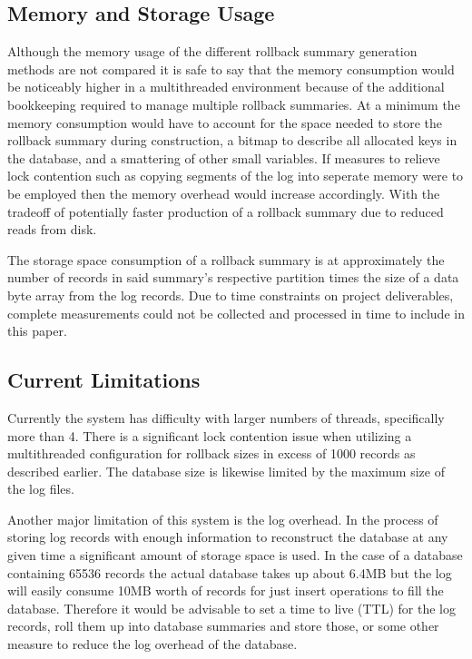 \documentclass{article}
\begin{document}
\subsection{Memory and Storage Usage}

Although the memory usage of the different rollback summary generation methods are not compared it is safe to say that the memory consumption would be noticeably higher in a multithreaded environment because of the additional bookkeeping required to manage multiple rollback summaries. At a minimum the memory consumption would have to account for the space needed to store the rollback summary during construction, a bitmap to describe all allocated keys in the database, and a smattering of other small variables. If measures to relieve lock contention such as copying segments of the log into seperate memory were to be employed then the memory overhead would increase accordingly. With the tradeoff of potentially faster production of a rollback summary due to reduced reads from disk.

The storage space consumption of a rollback summary is at approximately the number of records in said summary's respective partition times the size of a data byte array from the log records. Due to time constraints on project deliverables, complete measurements could not be collected and processed in time to include in this paper.

\subsection{Current Limitations}
Currently the system has difficulty with larger numbers of threads, specifically more than 4. There is a significant lock contention issue when utilizing a multithreaded configuration for rollback sizes in excess of 1000 records as described earlier. The database size is likewise limited by the maximum size of the log files.

Another major limitation of this system is the log overhead. In the process of storing log records with enough information to reconstruct the database at any given time a significant amount of storage space is used. In the case of a database containing 65536 records the actual database takes up about 6.4MB but the log will easily consume 10MB worth of records for just insert operations to fill the database. Therefore it would be advisable to set a time to live (TTL) for the log records, roll them up into database summaries and store those, or some other measure to reduce the log overhead of the database.
\end{document}
